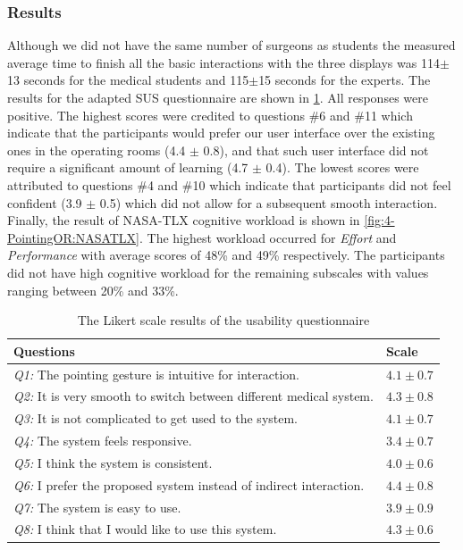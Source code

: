 {\subsubsection{Results}
Although we did not have the same number of surgeons as students the measured average time to finish all the basic interactions with the three displays was 114$\pm$13 seconds for the medical students and 115$\pm$15 seconds for the experts. 
The results for the adapted SUS questionnaire are shown in \tablename{\ref{tb:4-PointingOR:questionnaire}}.
All responses were positive. The highest scores were credited to questions \#6 and \#11 which indicate that the participants would prefer our user interface over the existing ones in the operating rooms (4.4 $\pm$ 0.8), and that such user interface did not require a significant amount of learning (4.7 $\pm$ 0.4). The lowest scores were attributed to questions \#4 and \#10 which indicate that participants did not feel confident (3.9 $\pm$ 0.5) which did not allow for a subsequent smooth interaction. Finally, the result of NASA-TLX cognitive workload is shown in \figurename{\ref{fig:4-PointingOR:NASATLX}}. The highest workload occurred for \textit{Effort} and \textit{Performance} with average scores of 48\% and 49\% respectively. The participants did not have high cognitive workload for the remaining subscales with values ranging between 20\% and 33\%.
\begin{table}
	\caption{The Likert scale results of the usability questionnaire}
	\label{tb:4-PointingOR:questionnaire}
	\scriptsize
	\begin{center}
		\begin{tabular}{p{8cm}|p{1.2cm}}
			Questions & Scale \\
			\hline
			\textit{Q1:} The pointing gesture is intuitive for interaction. &  $4.1\pm0.7$ \\
			\textit{Q2:} It is very smooth to switch between different medical system. & $4.3\pm0.8$ \\
			\textit{Q3:} It is not complicated to get used to the system. & $4.1\pm0.7$ \\
			\textit{Q4:} The system feels responsive. & $3.4\pm0.7$\\
			\textit{Q5:} I  think the system is consistent. & $4.0\pm0.6$ \\
			\textit{Q6:} I prefer the proposed system instead of indirect interaction. & $4.4\pm0.8$ \\
			\textit{Q7:} The system is easy to use.& $3.9\pm0.9$ \\
			\textit{Q8:} I think that I would like to use this system. & $4.3\pm0.6$ \\

\end{tabular}
\end{center}
\end{table}}
